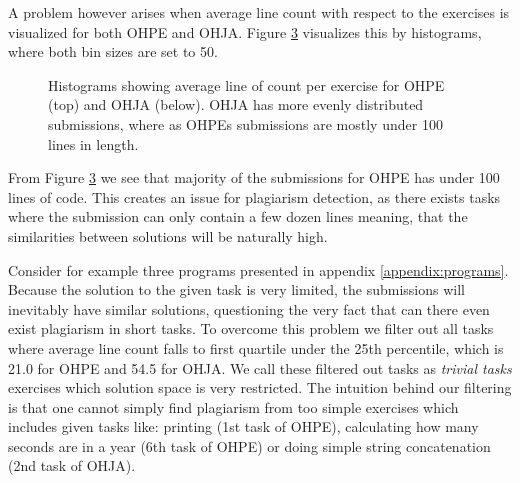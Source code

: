 A problem however arises when average line count with respect to the exercises is visualized for both OHPE and OHJA. Figure \ref{fig-hists} visualizes this by histograms, where both bin sizes are set to 50. 


\begin{figure}[!h]
\centering
\captionsetup[subfigure]{justification=centering}

\begin{subfigure}{\textwidth}
    \setlength\figureheight{5cm}
    \setlength\figurewidth{\textwidth}
    
    \label{fig-ohpeavgloc}
\end{subfigure}

\begin{subfigure}{\textwidth}
  \setlength\figureheight{5cm}
    \setlength\figurewidth{\textwidth}
    
    \label{fig-ohjaavgloc}
\end{subfigure}

\caption[Two histograms for corpora]{Histograms showing average line of count per exercise for OHPE (top) and OHJA (below). OHJA has more evenly distributed submissions, where as OHPEs submissions are mostly under 100 lines in length.}
\label{fig-hists}
\end{figure}

\noindent
From Figure \ref{fig-hists} we see that majority of the submissions for OHPE has under 100 lines of code. This creates an issue for plagiarism detection, as there exists tasks where the submission can only contain a few dozen lines meaning, that the similarities between solutions will be naturally high. 

Consider for example three programs presented in appendix \ref{appendix:programs}. Because the solution to the given task is very limited, the submissions will inevitably have similar solutions, questioning the very fact that can there even exist plagiarism in short tasks. To overcome this problem we filter out all tasks where average line count falls to first quartile \ie under the 25th percentile, which is 21.0 for OHPE and 54.5 for OHJA. We call these filtered out tasks as \emph{trivial tasks} \ie exercises which solution space is very restricted. The intuition behind our filtering is that one cannot simply find plagiarism from too simple exercises which includes given tasks like: printing  (1st task of OHPE), calculating how many seconds are in a year (6th task of OHPE) or doing simple string concatenation (2nd task of OHJA). 

